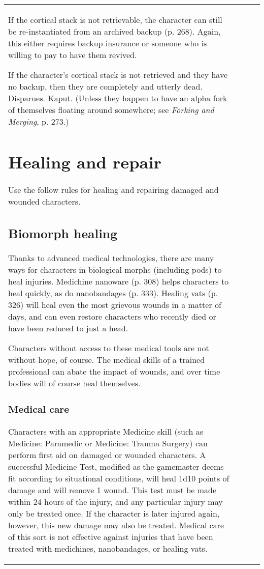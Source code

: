 \begin{table}
\begin{tabular}{|p{8cm}|r|r|r|}
If the cortical stack is not retrievable, the character can still be re-instantiated from an archived backup (p. 268). Again, this either requires backup insurance or someone who is willing to pay to have them revived. 

If the character’s cortical stack is not retrieved and they have no backup, then they are completely and utterly dead. Disparues. Kaput. (Unless they happen to have an alpha fork of themselves floating around somewhere; see \emph{Forking and Merging}, p. 273.) 



\section{Healing and repair} \label{sec:healing-repair} 

Use the follow rules for healing and repairing damaged and wounded characters. 

\subsection{Biomorph healing} 

Thanks to advanced medical technologies, there are many ways for characters in biological morphs (including pods) to heal injuries. Medichine nanoware (p. 308) helps characters to heal quickly, as do nanobandages (p. 333). Healing vats (p. 326) will heal even the most grievous wounds in a matter of days, and can even restore characters who recently died or have been reduced to just a head. 

Characters without access to these medical tools are not without hope, of course. The medical skills of a trained professional can abate the impact of wounds, and over time bodies will of course heal themselves. 

\subsubsection{Medical care} 

Characters with an appropriate Medicine skill (such as Medicine: Paramedic or Medicine: Trauma Surgery) can perform first aid on damaged or wounded characters. A successful Medicine Test, modified as the gamemaster deems fit according to situational conditions, will heal 1d10 points of damage and will remove 1 wound. This test must be made within 24 hours of the injury, and any particular injury may only be treated once. If the character is later injured again, however, this new damage may also be treated. Medical care of this sort is not effective against injuries that have been treated with medichines, nanobandages, or healing vats. 


\end{tabular}
\end{table}
